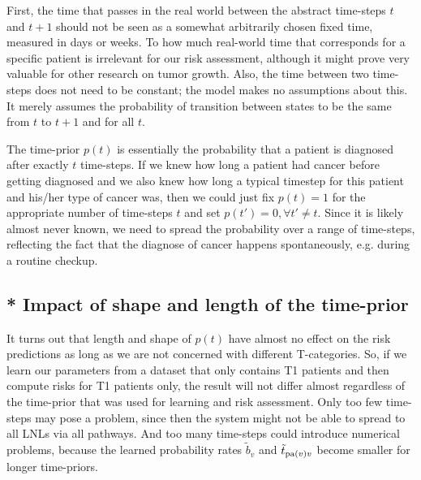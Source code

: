 \documentclass[\relativeRoot/main.tex]{subfiles}
\begin{document}
First, the time that passes in the real world between the abstract time-steps $t$ and $t+1$ should not be seen as a somewhat arbitrarily chosen fixed time, measured in days or weeks. To how much real-world time that corresponds for a specific patient is irrelevant for our risk assessment, although it might prove very valuable for other research on tumor growth. Also, the time between two time-steps does not need to be constant; the model makes no assumptions about this. It merely assumes the probability of transition between states to be the same from $t$ to $t+1$ and for all $t$.

The time-prior $p(t)$ is essentially the probability that a patient is diagnosed after exactly $t$ time-steps. If we knew how long a patient had cancer before getting diagnosed and we also knew how long a typical timestep for this patient and his/her type of cancer was, then we could just fix $p(t)=1$ for the appropriate number of time-steps $t$ and set $p(t') = 0, \forall t' \neq t$. Since it is likely almost never known, we need to spread the probability over a range of time-steps, reflecting the fact that the diagnose of cancer happens spontaneously, e.g. during a routine checkup.

\subsection{* Impact of shape and length of the time-prior}
\label{subsec:unilateral:tstage:shape}

It turns out that length and shape of $p(t)$ have almost no effect on the risk predictions as long as we are not concerned with different T-categories. So, if we learn our parameters from a dataset that only contains T1 patients and then compute risks for T1 patients only, the result will not differ almost regardless of the time-prior that was used for learning and risk assessment. Only too few time-steps may pose a problem, since then the system might not be able to spread to all LNLs via all pathways. And too many time-steps could introduce numerical problems, because the learned probability rates $\tilde{b}_v$ and $\tilde{t}_{\operatorname{pa}(v)v}$  become smaller for longer time-priors.
\end{document}
